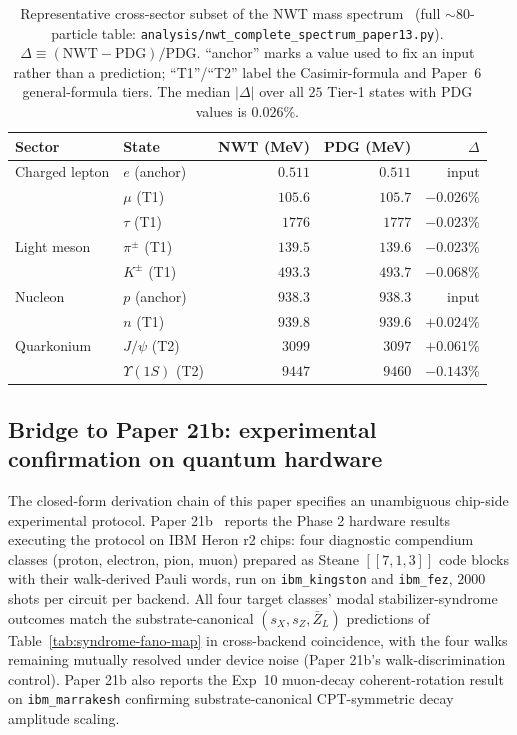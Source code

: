 \documentclass[11pt]{article}
\newcommand{\Klogical}{[[7, 1, 3]]}
\newcommand{\barZ}{\bar Z_L}
\begin{document}
\begin{table}[H]
\centering
\caption{Representative cross-sector subset of the NWT mass spectrum~\cite{Paper6,Paper8,Paper13} (full $\sim 80$-particle table: \texttt{analysis/nwt\_complete\_spectrum\_paper13.py}).  $\Delta \equiv (\text{NWT} - \text{PDG})/\text{PDG}$.  ``anchor'' marks a value used to fix an input rather than a prediction; ``T1''/``T2'' label the Casimir-formula and Paper~6 general-formula tiers.  The median $|\Delta|$ over all $25$ Tier-1 states with PDG values is $0.026\%$.}
\label{tab:spectrum-representative}
\small
\begin{tabular}{llrrr}
\toprule
Sector & State & NWT (MeV) & PDG (MeV) & $\Delta$ \\
\midrule
Charged lepton & $e$ (anchor)        & $0.511$  & $0.511$  & input \\
               & $\mu$ (T1)          & $105.6$  & $105.7$  & $-0.026\%$ \\
               & $\tau$ (T1)         & $1776$   & $1777$   & $-0.023\%$ \\
Light meson    & $\pi^\pm$ (T1)      & $139.5$  & $139.6$  & $-0.023\%$ \\
               & $K^\pm$ (T1)        & $493.3$  & $493.7$  & $-0.068\%$ \\
Nucleon        & $p$ (anchor)        & $938.3$  & $938.3$  & input \\
               & $n$ (T1)            & $939.8$  & $939.6$  & $+0.024\%$ \\
Quarkonium     & $J/\psi$ (T2)       & $3099$   & $3097$   & $+0.061\%$ \\
               & $\Upsilon(1S)$ (T2) & $9447$   & $9460$   & $-0.143\%$ \\
\bottomrule
\end{tabular}
\end{table}

\subsection{Bridge to Paper 21b: experimental confirmation on quantum hardware}
\label{sec:bridge-to-21b}

The closed-form derivation chain of this paper specifies an unambiguous chip-side experimental protocol.  Paper 21b~\cite{Paper21b} reports the Phase 2 hardware results executing the protocol on IBM Heron r2 chips: four diagnostic compendium classes (proton, electron, pion, muon) prepared as Steane $\Klogical$ code blocks with their walk-derived Pauli words, run on \texttt{ibm\_kingston} and \texttt{ibm\_fez}, $2000$ shots per circuit per backend.  All four target classes' modal stabilizer-syndrome outcomes match the substrate-canonical $(s_X, s_Z, \barZ)$ predictions of Table~\ref{tab:syndrome-fano-map} in cross-backend coincidence, with the four walks remaining mutually resolved under device noise (Paper 21b's walk-discrimination control).  Paper 21b also reports the Exp~10 muon-decay coherent-rotation result on \texttt{ibm\_marrakesh} confirming substrate-canonical CPT-symmetric decay amplitude scaling.
\end{document}
